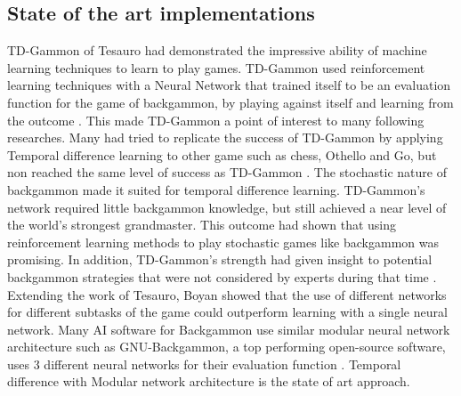 \documentclass[12pt,a4paper]{article}
\begin{document}
\subsection{State of the art implementations}
TD-Gammon of Tesauro \citeyear{DBLP:conf/icml/Tesauro92,DBLP:journals/ai/Tesauro02} had demonstrated the impressive ability of machine learning techniques to learn to play games.  TD-Gammon used reinforcement learning techniques with a Neural Network that trained itself to be an evaluation function for the game of backgammon, by playing against itself and learning from the outcome \cite{DBLP:journals/ai/Tesauro02}. This made TD-Gammon a point of interest to many following researches. Many had tried to replicate the success of TD-Gammon by applying Temporal difference learning to other game such as chess, Othello and Go, but non reached the same level of success as TD-Gammon \cite{survey}. The stochastic nature of backgammon made it suited for temporal difference learning. 
TD-Gammon's network required little backgammon knowledge, but still achieved a near level of the world's strongest grandmaster. This outcome had shown that using reinforcement learning methods to play stochastic games like backgammon was promising. In addition, TD-Gammon's strength had given insight to potential backgammon strategies that were not considered by experts during that time \cite{rl}. Extending the work of Tesauro, Boyan \citeyear{boyan} showed that the use of different networks for different subtasks of the game could outperform learning with a single neural network. Many AI software for Backgammon use similar modular neural network architecture such as GNU-Backgammon, a top performing open-source software, uses 3 different neural networks for their evaluation function \cite{gnubg}. Temporal difference with Modular network architecture is the state of art approach.
\end{document}
